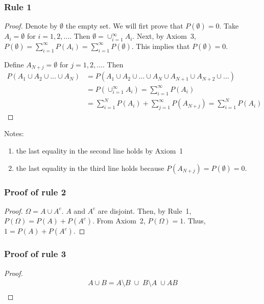 \begin{frame}
    \frametitle{Rule 1}

	\footnotesize
	\begin{proof}
		Denote by $\emptyset$ the empty set. We will firt prove that $P(\emptyset)=0$. Take $A_i=\emptyset$ for $i=1, 2, \ldots$. Then $\emptyset=\cup_{i=1}^\infty A_i$. Next, by Axiom~3, $P(\emptyset)=\sum_{i=1}^\infty P(A_i)=\sum_{i=1}^\infty P(\emptyset)$. This implies that $P(\emptyset)=0$.

		Define $A_{N+j}=\emptyset$ for $j=1,2,\ldots$. Then
		\footnotesize
		\begin{align*}
            P(A_1\cup A_2\cup\ldots\cup A_N)&=P(A_1\cup A_2\cup\ldots\cup A_N\cup A_{N+1}\cup A_{N+2}\cup\ldots)\\
										    &=P(\cup_{i=1}^\infty A_i)=\sum_{i=1}^\infty P(A_i)\\
                                            &=\sum_{i=1}^N P(A_i)+\sum_{j=1}^\infty P(A_{N+j})=\sum_{i=1}^N P(A_i)
		\end{align*}
		\normalsize

	\end{proof}

	Notes:
	\begin{enumerate}
		\item the last equality in the second line holds by Axiom~1
		\item the last equality in the third line holds because $P(A_{N+j})=P(\emptyset)=0$.
	\end{enumerate}
    \normalsize

\end{frame}

\begin{frame}
    \frametitle{Proof of rule 2}

	\begin{proof}

		$\Omega=A\cup A^c$. $A$ and $A^c$ are disjoint. Then, by Rule~1, $P(\Omega)=P(A)+P(A^c)$. From Axiom~2, $P(\Omega)=1$. Thus, $1=P(A)+P(A^c)$.

	\end{proof}

\end{frame}

\begin{frame}
    \frametitle{Proof of rule 3}

	\begin{proof}

		\begin{align*}
			A\cup B=A\setminus B\;\cup\;B\setminus A\;\cup AB\\
		\end{align*}

	\end{proof}

\end{frame}

